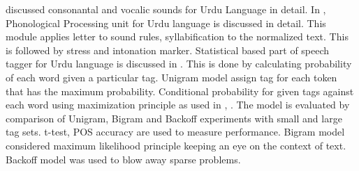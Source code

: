 

\cite{saleem2002urdu} discussed consonantal and vocalic sounds for Urdu Language in detail. In \cite{hussain2005phonological}, Phonological Processing unit for Urdu language is discussed in detail. This module applies letter to sound rules, syllabification to the normalized text. This is followed by stress and intonation
marker. Statistical based part of speech tagger for Urdu language is discussed in \cite{anwar2007statistical}. This is done by calculating probability of each word given a particular tag. Unigram model assign tag for each token that has the maximum probability. Conditional probability for given tags against each word using maximization principle as used in \cite{bird2007introduction}, \cite{carlberger1999implementing}. The model is evaluated by comparison of Unigram, Bigram and Backoff experiments with small and large tag sets. t-test, POS accuracy are used to measure performance. Bigram model considered maximum likelihood principle keeping an
eye on the context of text. Backoff model was used to blow away sparse problems. 


